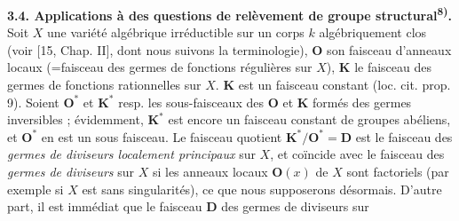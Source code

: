 \indent\textbf{3.4. Applications à des questions de relèvement de groupe
structural\textsuperscript{8)}.} Soit $X$ une variété algébrique irréductible
sur un corps $k$ algébriquement clos (voir [15, Chap. II], dont nous suivons
la terminologie), $\mathbf O$ son faisceau d'anneaux locaux (=faisceau des
germes de fonctions régulières sur $X$), $\mathbf K$ le faisceau des germes de
fonctions rationnelles sur $X$. $\mathbf K$ est un faisceau constant
(loc. cit. prop. 9). Soient $\mathbf O^*$ et $\mathbf K^*$ resp. les
sous-faisceaux des $\mathbf O$ et $\mathbf K$ formés des germes inversibles ;
évidemment, $\mathbf K^*$ est encore un faisceau constant de groupes
abéliens, et $\mathbf O^*$ en est un sous faisceau.
Le faisceau quotient $\mathbf K^*/\mathbf O^*=\mathbf D$ est le faisceau des
\textit{germes de diviseurs localement principaux} sur $X$, et coïncide avec
le faisceau des \textit{germes de diviseurs} sur $X$ si les anneaux locaux
$\mathbf O(x)$ de $X$ sont factoriels (par exemple si $X$ est sans
singularités), ce que nous supposerons désormais. D'autre part, il est
immédiat que le faisceau $\mathbf D$ des germes de diviseurs sur



